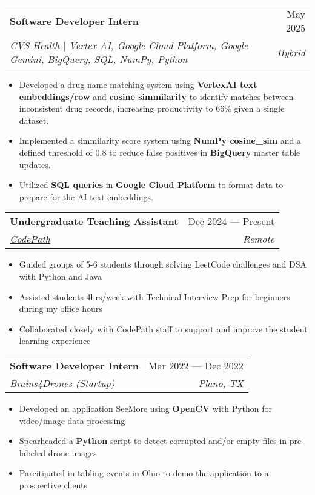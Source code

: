 \documentclass[letterpaper,11pt]{article}
\makeatletter
\newcommand{\resumeItem}[1]{
  \item\small{
    {#1 \vspace{-2pt}}
  }
}
\newcommand{\resumeSubheading}[4]{
  \vspace{-2pt}\item
    \begin{tabular*}{0.97\textwidth}[t]{l@{\extracolsep{\fill}}r}
      \textbf{#1} & #2 \\
      \textit{\small#3} & \textit{\small #4} \\
    \end{tabular*}\vspace{-7pt}
}
\newcommand{\resumeItemListStart}{\begin{itemize}}
\newcommand{\resumeItemListEnd}{\end{itemize}\vspace{-5pt}}
\makeatother
\begin{document}
    \resumeSubheading
      {Software Developer Intern}{May 2025}
      {\href{https://www.cvshealth.com/}{\underline{CVS Health}} $|$ \textit{Vertex AI}, \textit{Google Cloud Platform}, \textit{Google Gemini}, \textit{BigQuery}, \textit{SQL}, \textit{NumPy}, \textit{Python}}{Hybrid}
      \resumeItemListStart
        \resumeItem{Developed a drug name matching system using {\textbf{VertexAI text embeddings/row}} and {\textbf{cosine simmilarity}} to identify matches between inconsistent drug records, increasing productivity to 66\% given a single dataset.}
        \resumeItem{Implemented a simmilarity score system using {\textbf{NumPy cosine\_sim}} and a defined threshold of 0.8 to reduce false positives in {\textbf{BigQuery}} master table updates.}
        \resumeItem{Utilized {\textbf{SQL queries}} in {\textbf{Google Cloud Platform}} to format data to prepare for the AI text embeddings.}
    \resumeItemListEnd


    \resumeSubheading
      {Undergraduate Teaching Assistant}{Dec 2024 — Present}
      {\href{https://www.codepath.org/}{\underline{CodePath}}}{Remote}
      \resumeItemListStart
        \resumeItem{Guided groups of 5-6 students through solving LeetCode challenges and DSA with Python and Java}
        \resumeItem{Assisted students 4hrs/week with Technical Interview Prep for beginners during my office hours}
        \resumeItem{Collaborated closely with CodePath staff to support and improve the student learning experience}
      \resumeItemListEnd

    \resumeSubheading
      {Software Developer Intern}{Mar 2022 — Dec 2022}
      {\href{https://brains4drones.com/solutions/}{\underline{Brains4Drones (Startup)}}}{Plano, TX}
      \resumeItemListStart
        \resumeItem{Developed an application SeeMore using {\textbf{OpenCV}} with Python for video/image data processing}
        \resumeItem{Spearheaded a {\textbf{Python}} script to detect corrupted and/or empty files in pre-labeled drone images}
        \resumeItem{Parcitipated in tabling events in Ohio to demo the application to a prospective clients}
    \resumeItemListEnd

\end{document}
